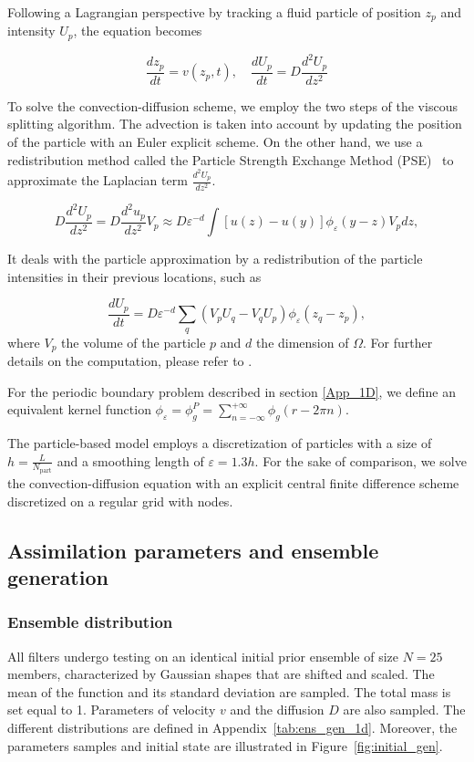 Following a Lagrangian perspective by tracking a fluid particle of position $z_p$ and intensity $U_p$, the equation becomes

\begin{equation*}
	\frac{dz_p}{dt} = v(z_p, t), \quad \frac{dU_p}{dt} = D \frac{d^2 U_p}{dz^2}
\end{equation*}

To solve the convection-diffusion scheme, we employ the two steps of the viscous splitting algorithm. The advection is taken into account by updating the position of the particle with an Euler explicit scheme.
On the other hand, we use a redistribution method called the Particle Strength Exchange Method (PSE)~\cite{degond_1989,cottet_1990} to approximate the Laplacian term $\frac{d^2 U_p}{dz^2}$.


\begin{equation*}
	D \frac{d^2 U_p}{dz^2}  = D  \frac{d^2 u_p}{dz^2} V_p \approx D  \varepsilon^{-d} \int [u(z)  - u(y)] \phi_\varepsilon(y - z) V_p dz,
\end{equation*}

It deals with the particle approximation by a redistribution of the particle intensities in their previous locations, such as

\begin{equation*}
	\frac{dU_p}{dt} = D \varepsilon^{-d}  \sum_q (V_p U_q -V_q U_p) \phi_\varepsilon( z_q -  z_p),
\end{equation*}where $V_p$ the volume of the particle $p$ and $d$ the dimension of $\Omega$.
For further details on the computation, please refer to \cite{cottet_1990}.

For the periodic boundary problem described in section \ref{App_1D}, we define an equivalent kernel function $\phi_\varepsilon= \phi^P_g = \sum_{n=-\infty}^{+\infty} \phi_g(r - 2 \pi  n )$.

The particle-based model employs a discretization of \npart{} particles with a size of $h = \frac{L}{N_{\text{part}}}$ and a smoothing length of $\varepsilon = 1.3 h$.
For the sake of comparison, we solve the convection-diffusion equation with an explicit central finite difference scheme discretized on a regular grid with \ngrid{} nodes.

\subsection{Assimilation parameters and ensemble generation}

\subsubsection{Ensemble distribution}
All filters undergo testing on an identical initial prior ensemble of size $N = 25$ members, characterized by Gaussian shapes that are shifted and scaled. The mean of the function and its standard deviation are sampled. The total mass is set equal to 1. Parameters of velocity $v$ and the diffusion $D$ are also sampled. The different distributions are defined in Appendix~\ref{tab:ens_gen_1d}. Moreover, the parameters samples and initial state are illustrated in Figure~\ref{fig:initial_gen}.

